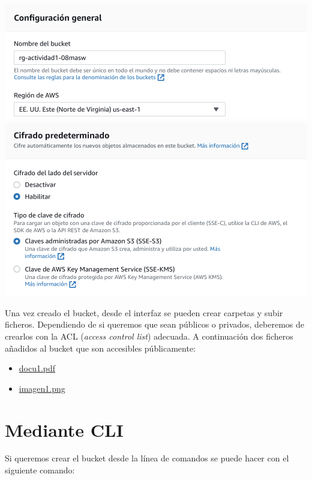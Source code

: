 \documentclass{\ClassPath/viu-tfm-template}
\begin{document}
\begin{center}
    \includegraphics[width=0.8\linewidth]{img/s31.png}
    \includegraphics[width=0.8\linewidth]{img/s33.png}
\end{center}

Una vez creado el bucket, desde el interfaz se pueden crear carpetas y subir ficheros. Dependiendo de si queremos que sean públicos o privados, deberemos de crearlos con la ACL (\textit{access control list}) adecuada. A continuación dos ficheros añadidos al bucket que son accesibles públicamente:
\begin{itemize}
    \item \href{https://rg-actividad1-08masw.s3.amazonaws.com/actividad1/docu1.pdf}{docu1.pdf}
    \item \href{https://rg-actividad1-08masw.s3.amazonaws.com/actividad1/imagen1.png}{imagen1.png}
\end{itemize}

\section{Mediante CLI}
Si queremos crear el bucket desde la línea de comandos se puede hacer con el siguiente comando:

\end{document}
